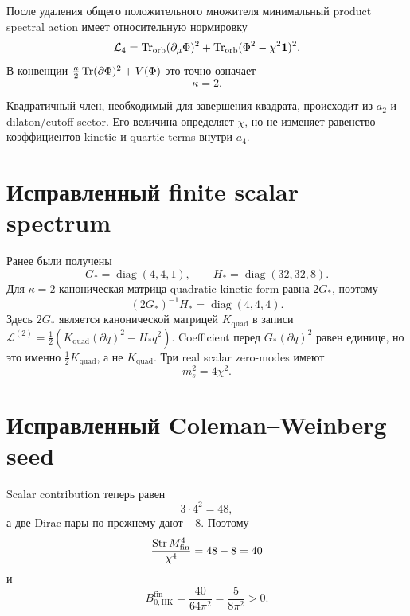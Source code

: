 \begin{theorem}
После удаления общего положительного множителя минимальный product
spectral action имеет относительную нормировку
\begin{equation}
 \mathcal L_4
 =
 \operatorname{Tr}_{\mathrm{orb}}(\partial_\mu\Phi)^2
 +\operatorname{Tr}_{\mathrm{orb}}(\Phi^2-\chi^2\mathbf1)^2.
\end{equation}
В конвенции
\(\frac{\kappa}{2}\operatorname{Tr}(\partial\Phi)^2+V(\Phi)\) это точно означает
\begin{equation}
 \boxed{\kappa=2.}
\end{equation}
\end{theorem}

Квадратичный член, необходимый для завершения квадрата, происходит из
\(a_2\) и dilaton/cutoff sector. Его величина определяет \(\chi\), но не
изменяет равенство коэффициентов kinetic и quartic terms внутри \(a_4\).

\section{Исправленный finite scalar spectrum}

Ранее были получены
\begin{equation}
 G_*=\operatorname{diag}(4,4,1),
 \qquad
 H_*=\operatorname{diag}(32,32,8).
\end{equation}
Для \(\kappa=2\) каноническая матрица quadratic kinetic form равна
\(2G_*\), поэтому
\begin{equation}
 (2G_*)^{-1}H_*
 =\operatorname{diag}(4,4,4).
\end{equation}
Здесь \(2G_*\) является канонической матрицей \(K_{\mathrm{quad}}\) в
записи
\(\mathcal L^{(2)}=\frac12(K_{\mathrm{quad}}(\partial q)^2-H_*q^2)\).
Coefficient перед \(G_*(\partial q)^2\) равен единице, но это именно
\(\frac12K_{\mathrm{quad}}\), а не \(K_{\mathrm{quad}}\).
Три real scalar zero-modes имеют
\begin{equation}
 m_s^2=4\chi^2.
\end{equation}

\section{Исправленный Coleman--Weinberg seed}

Scalar contribution теперь равен
\begin{equation}
 3\cdot4^2=48,
\end{equation}
а две Dirac-пары по-прежнему дают \(-8\). Поэтому
\begin{equation}
 \frac{\operatorname{Str} M^4_{\mathrm{fin}}}{\chi^4}
 =48-8=40
\end{equation}
и
\begin{equation}
 \boxed{
 B_{0,\mathrm{HK}}^{\mathrm{fin}}
 =\frac{40}{64\pi^2}
 =\frac5{8\pi^2}>0.}
\end{equation}

